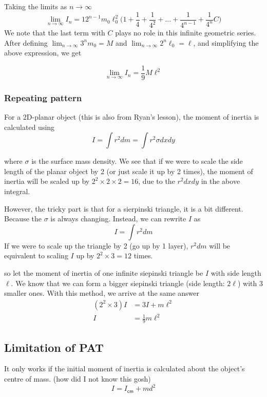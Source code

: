 Taking the limits as $n\to\infty$
\begin{equation}
    \lim_{n\to\infty}I_n=12^{n-1}m_0\ell_0^2\bigg(1+\frac{1}{4}+\frac{1}{4^2}+...+\frac{1}{4^{n-1}}+\frac{1}{4^n}C\bigg)
\end{equation}
We note that the last term with $C$ plays no role in this infinite geometric series. After defining $\lim_{n\to\infty} 3^n m_0=M $ and $\lim_{n\to\infty} 2^n \ell_0=\ell$, and simplifying the above expression, we get

\begin{equation}
    \lim_{n\to\infty}I_n=\frac{1}{9}M\ell^2
\end{equation}

\subsubsection{Repeating pattern}
For a 2D-planar object (this is also from Ryan's lesson), the moment of inertia is calculated using 
\begin{equation}
    I=\int r^2 dm =\int r^2 \sigma dx dy
\end{equation}

where $\sigma$ is the surface mass density. We see that if we were to scale the side length of the planar object by 2 (or just scale it up by 2 times), the moment of inertia will be scaled up by $2^2 \times 2 \times 2=16$, due to the $r^2 dx dy$ in the above integral. 

However, the tricky part is that for a sierpinski triangle, it is a bit different. Because the $\sigma$ is always changing. Instead, we can rewrite $I$ as 
\begin{equation}
    I=\int r^2 dm
\end{equation}
If we were to scale up the triangle by 2 (go up by 1 layer), $r^2 dm$ will be equivalent to scaling $I$ up by $2^2 \times 3= 12$ times. 

so let the moment of inertia of one infinite siepinski triangle be $I$ with side length $\ell$. We know that we can form a bigger siepinski triangle (side length: $2\ell$) with 3 smaller ones. With this method, we arrive at the same answer
\begin{align}
    (2^2\times 3) I &= 3I+ m \ell^2\\
    I&=\frac{1}{9}m \ell^2
\end{align}

\subsection{Limitation of PAT}
It only works if the initial moment of inertia is calculated about the object's centre of mass. (how did I not know this gosh)
\begin{equation}
    I=I_{\textsf{cm}}+md^2
\end{equation}


